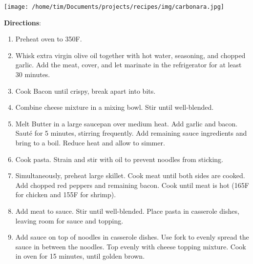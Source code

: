\documentclass[11pt, twoside, openany]{book}
\begin{document}
\begin{minipage}[t]{\linewidth}
\noindent\begin{minipage}[t]{0.18\linewidth}
\centering \strut\vspace*{-\baselineskip}\newline
\texttt{[image: /home/tim/Documents/projects/recipes/img/carbonara.jpg]}\\
\end{minipage}\vspace{3mm}
\textbf{Directions}:
\vspace{-3mm}\begin{enumerate}\setlength\itemsep{-1mm}
\item Preheat oven to 350F.
\item Whisk extra virgin olive oil together with hot water, seasoning, and chopped garlic. Add the meat, cover, and let marinate in the refrigerator for at least 30 minutes.
\item Cook Bacon until crispy, break apart into bits.
\item Combine cheese mixture in a mixing bowl. Stir until well-blended.
\item Melt Butter in a large saucepan over medium heat. Add garlic and bacon. Sauté for 5 minutes, stirring frequently.  Add remaining sauce ingredients and bring to a boil.  Reduce heat and allow to simmer.
\item Cook pasta. Strain and stir with oil to prevent noodles from sticking.
\item Simultaneously, preheat large skillet. Cook meat until both sides are cooked. Add chopped red peppers and remaining bacon. Cook until meat is hot (165F for chicken and 155F for shrimp).
\item Add meat to sauce. Stir until well-blended. Place pasta in casserole dishes, leaving room for sauce and topping.
\item Add sauce on top of noodles in casserole dishes. Use fork to evenly spread the sauce in between the noodles. Top evenly with cheese topping mixture. Cook in oven for 15 minutes, until golden brown.
\end{enumerate}
\end{minipage}\vspace{8mm}
\end{document}

